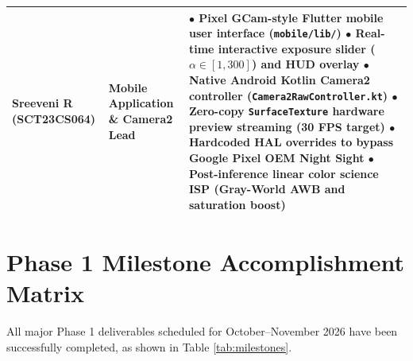 \begin{table}[t]
{\begin{tabular}{lp{4.2cm}p{8.5cm}}
\textbf{Sreeveni R} \newline (SCT23CS064) & Mobile Application \& Camera2 Lead & 
$\bullet$ Pixel GCam-style Flutter mobile user interface (\texttt{mobile/lib/}) \newline
$\bullet$ Real-time interactive exposure slider ($\alpha \in [1, 300]$) and HUD overlay \newline
$\bullet$ Native Android Kotlin Camera2 controller (\texttt{Camera2RawController.kt}) \newline
$\bullet$ Zero-copy \texttt{SurfaceTexture} hardware preview streaming (30 FPS target) \newline
$\bullet$ Hardcoded HAL overrides to bypass Google Pixel OEM Night Sight \newline
$\bullet$ Post-inference linear color science ISP (Gray-World AWB and saturation boost) \\ \bottomrule
\end{tabular}%
}
\end{table}

\section{Phase 1 Milestone Accomplishment Matrix}
All major Phase 1 deliverables scheduled for October--November 2026 have been successfully completed, as shown in Table \ref{tab:milestones}.

\begin{table}[h]
\centering
\caption{Phase 1 Milestone Accomplishment Matrix}
\label{tab:milestones}
\end{table}

